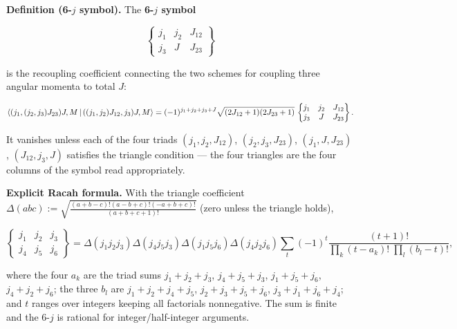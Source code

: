 \medskip\noindent\textbf{Definition (6-$j$ symbol).} The \textbf{6-$j$ symbol}
\begin{linenomath}
\begin{equation}
\begin{Bmatrix}j_{1}&j_{2}&J_{12}\\ j_{3}&J&J_{23}\end{Bmatrix}
\label{eq:6j}
\end{equation}
\end{linenomath}
is the recoupling coefficient connecting the two schemes for coupling three angular momenta to total $J$:
\begin{linenomath}
\begin{equation}
\braket{(j_{1},(j_{2},j_{3})J_{23})J,M\,|\,((j_{1},j_{2})J_{12},j_{3})J,M}
=(-1)^{j_{1}+j_{2}+j_{3}+J}\sqrt{(2J_{12}+1)(2J_{23}+1)}\,
\begin{Bmatrix}j_{1}&j_{2}&J_{12}\\ j_{3}&J&J_{23}\end{Bmatrix}.
\label{eq:6j-recoupling}
\end{equation}
\end{linenomath}
It vanishes unless each of the four triads $(j_{1},j_{2},J_{12})$, $(j_{2},j_{3},J_{23})$, $(j_{1},J,J_{23})$, $(J_{12},j_{3},J)$ satisfies the triangle condition --- the four triangles are the four columns of the symbol read appropriately.

\medskip\noindent\textbf{Explicit Racah formula.} With the triangle coefficient $\Delta(abc):=\sqrt{\frac{(a+b-c)!(a-b+c)!(-a+b+c)!}{(a+b+c+1)!}}$ (zero unless the triangle holds),
\begin{linenomath}
\begin{equation}
\begin{Bmatrix}j_{1}&j_{2}&j_{3}\\ j_{4}&j_{5}&j_{6}\end{Bmatrix}
=\Delta(j_{1}j_{2}j_{3})\Delta(j_{4}j_{5}j_{3})\Delta(j_{1}j_{5}j_{6})\Delta(j_{4}j_{2}j_{6})
\sum_{t}(-1)^{t}\frac{(t+1)!}{\prod\limits_{k}(t-a_{k})!\;\prod\limits_{l}(b_{l}-t)!},
\label{eq:6j-racah}
\end{equation}
\end{linenomath}
where the four $a_{k}$ are the triad sums $j_{1}+j_{2}+j_{3}$, $j_{4}+j_{5}+j_{3}$, $j_{1}+j_{5}+j_{6}$, $j_{4}+j_{2}+j_{6}$; the three $b_{l}$ are $j_{1}+j_{2}+j_{4}+j_{5}$, $j_{2}+j_{3}+j_{5}+j_{6}$, $j_{3}+j_{1}+j_{6}+j_{4}$; and $t$ ranges over integers keeping all factorials nonnegative. The sum is finite and the 6-$j$ is rational for integer/half-integer arguments.

